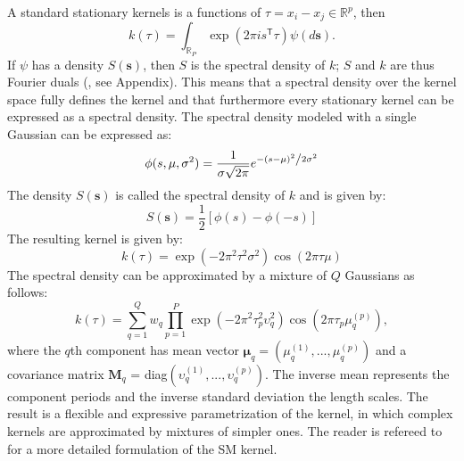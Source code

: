 \documentclass[letterpaper]{article}
\begin{document}
A standard stationary kernels is a functions of $\tau=x_i - x_j \in \mathbb{R}^p$, then
\begin{equation}\label{eqn:bochner-theorem}
k(\tau) = \int_{\mathbb{R}_P} \exp({2\pi is^\mathsf{T}\tau})\psi(d\mathbf{s}).
\end{equation}
If $\psi$ has a density $S(\mathbf{s})$, then $S$ is the spectral density of $k$; $S$ and $k$ are thus Fourier duals (\cite{williams2006gaussian}, see Appendix). This means that a spectral density over the kernel space fully defines the kernel and that furthermore every stationary kernel can be expressed as a spectral density. The spectral density modeled with a single Gaussian can be expressed as:
\begin{equation}\label{eqn:single-guassian}
\phi(s,\mu,\sigma^2) = \frac{1}{{\sigma \sqrt {2\pi } }}e^{{{ - \left( {s - \mu } \right)^2 } \mathord{\left/ {\vphantom {{ - \left( {s - \mu } \right)^2 } {2\sigma ^2 }}} \right. \kern-\nulldelimiterspace} {2\sigma ^2 }}}
\end{equation}
The density $S(\mathbf{s})$ is called the spectral density of $k$ and is given by:
\begin{equation}\label{eqn:single-guassian}
S(\mathbf{s})=\frac{1}{2}[\phi(s)-\phi(-s)]
\end{equation}
The resulting kernel is given by:
\begin{equation}\label{eqn:spectral-kernel}
k(\tau)=\exp(-2\pi^2\tau^2\sigma^2)\cos(2\pi\tau\mu)
\end{equation}
The spectral density can be approximated by a mixture of $Q$ Gaussians \citep{wilson2015human} as follows:
\begin{equation}\label{eqn:mixture-of-guassians}
k(\tau) = \sum_{q=1}^{Q}w_q\prod_{p=1}^{P} \exp(-2\pi^2\tau_{p}^2\upsilon_q^2)\cos(2\pi\tau_p\mu_q^{(p)}),
\end{equation}
where the $q$th component has mean vector $\bm{\mu}_q=(\mu_q^{(1)}, ...,\mu_q^{(p)})$ and a covariance matrix $\mathbf{M}_q$ = diag$(\upsilon_q^{(1)}, ..., \upsilon_q^{(p)})$. The inverse mean represents the component periods and the inverse standard deviation the length scales. The result is a flexible and expressive parametrization of the kernel, in which complex kernels are approximated by mixtures of simpler ones. The reader is refereed to \cite{wilson2015human} for a more detailed formulation of the SM kernel.
\end{document}
